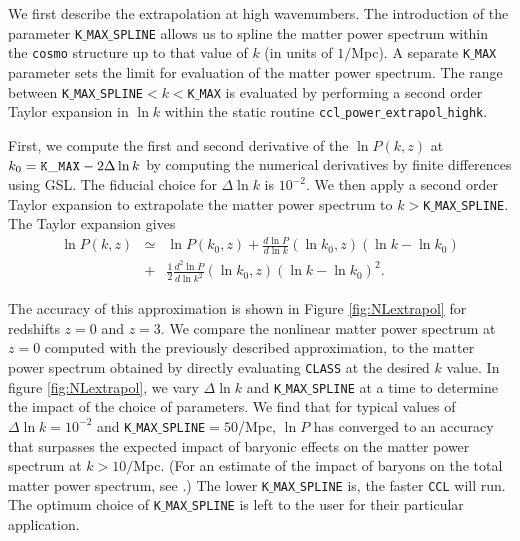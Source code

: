 \documentclass[\docopts]{\docclass}
\newcommand{\ccl}{{\tt CCL}\xspace}
\begin{document}
We first describe the extrapolation at high wavenumbers. The introduction of the parameter {\tt K$\_$MAX$\_$SPLINE} allows us to spline the matter power spectrum within the {\tt cosmo} structure up to that value of $k$ (in units of $1/$Mpc). A separate {\tt K$\_$MAX} parameter sets the limit for evaluation of the matter power spectrum. The range between {\tt K$\_$MAX$\_$SPLINE}$<k<${\tt K$\_$MAX} is evaluated by performing a second order Taylor expansion in $\ln k$ within the static routine {\tt ccl$\_$power$\_$extrapol$\_$highk}.

First, we compute the first and second derivative of the $\ln P(k,z)$ at $k_0={\rm \tt K\_MAX}-2\Delta\ln k$ by computing the numerical derivatives by finite differences using GSL. The fiducial choice for $\Delta\ln k$ is $10^{-2}$. We then apply a second order Taylor expansion to extrapolate the matter power spectrum to $k>${\tt K$\_$MAX$\_$SPLINE}. The Taylor expansion gives
%
\begin{eqnarray}
  \ln P(k,z) &\simeq& \ln P(k_0,z) + \frac{d\ln P}{d\ln k}(\ln k_0,z) (\ln k-\ln k_0)  \nonumber\\
  &+& \frac{1}{2}  \frac{d^2\ln P}{d\ln k^2}(\ln k_0,z) (\ln k-\ln k_0)^2.
  \label{eq:NLPSTaylor}
\end{eqnarray}

The accuracy of this approximation is shown in Figure \ref{fig:NLextrapol} for redshifts $z=0$ and $z=3$. We compare the nonlinear matter power spectrum at $z=0$ computed with the previously described approximation, to the matter power spectrum obtained by directly evaluating {\tt CLASS} at the desired $k$ value. In figure \ref{fig:NLextrapol}, we vary $\Delta \ln k$ and {\tt K$\_$MAX$\_$SPLINE} at a time to determine the impact of the choice of parameters. We find that for typical values of $\Delta \ln k=10^{-2}$ and {\tt K$\_$MAX$\_$SPLINE}$=50$/Mpc, $\ln P$ has converged to an accuracy that surpasses the expected impact of baryonic effects on the matter power spectrum at $k>10/$Mpc.  (For an estimate of the impact of baryons on the total matter power spectrum, see \citealt{Schneider15}.) The lower {\tt K$\_$MAX$\_$SPLINE} is, the faster \ccl will run. The optimum choice of {\tt K$\_$MAX$\_$SPLINE} is left to the user for their particular application.
\end{document}
